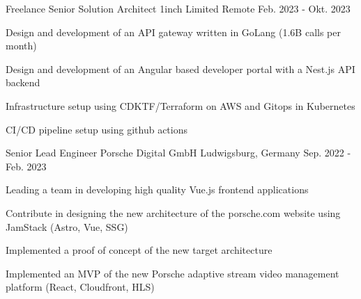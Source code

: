 
\begin{cventries}

  \cventry
    {Freelance Senior Solution Architect} %
    {1inch Limited} %
    {Remote} %
    {Feb. 2023 - Okt. 2023} %
    {
      \begin{cvitems} %
        \item {Design and development of an API gateway written in GoLang (1.6B calls per month)}
        \item {Design and development of an Angular based developer portal with a Nest.js API backend}
        \item {Infrastructure setup using CDKTF/Terraform on AWS and Gitops in Kubernetes}
        \item {CI/CD pipeline setup using github actions}
      \end{cvitems}
    }

  \cventry
    {Senior Lead Engineer} %
    {Porsche Digital GmbH} %
    {Ludwigsburg, Germany} %
    {Sep. 2022 - Feb. 2023} %
    {
      \begin{cvitems} %
        \item {Leading a team in developing high quality Vue.js frontend applications}
        \item {Contribute in designing the new architecture of the porsche.com website using JamStack (Astro, Vue, SSG)}
        \item {Implemented a proof of concept of the new target architecture}
        \item {Implemented an MVP of the new Porsche adaptive stream video management platform (React, Cloudfront, HLS)}
      \end{cvitems}
    }


\end{cventries}

